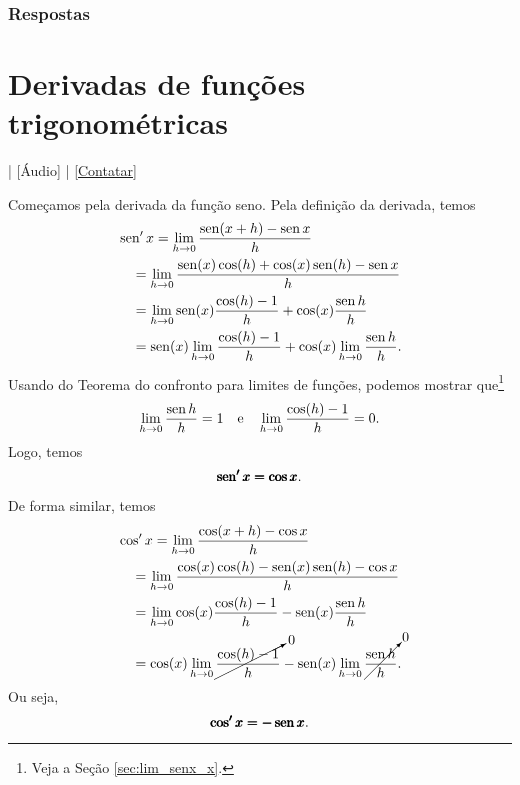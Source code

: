 \ifisbook
\subsubsection{Respostas}
\shipoutAnswer
\fi


\section{Derivadas de funções trigonométricas}\label{cap_deriv_sec_trigo}

\begin{flushright}
  [Vídeo] | [Áudio] | \href{https://phkonzen.github.io/notas/contato.html}{[Contatar]}
\end{flushright}

Começamos pela derivada da função seno. Pela definição da derivada, temos
\begin{align}
  & \operatorname{sen}' x = \lim_{h\to 0} \frac{\operatorname{sen}(x+h) - \operatorname{sen} x}{h} \\
  & \text{}\quad = \lim_{h\to 0} \frac{\operatorname{sen}(x)\cos(h)+\cos(x)\operatorname{sen}(h) - \operatorname{sen} x}{h} \\
  & \text{}\quad = \lim_{h\to 0} \operatorname{sen}(x)\frac{\cos(h) - 1}{h} + \cos(x)\frac{\operatorname{sen} h}{h}\\
  & \text{}\quad = \operatorname{sen}(x) \lim_{h\to 0} \frac{\cos(h)-1}{h} + \cos(x)\lim_{h\to 0} \frac{\operatorname{sen} h}{h}.
\end{align}
Usando do Teorema do confronto para limites de funções, podemos mostrar que\footnote{Veja a Seção \ref{sec:lim_senx_x}.}
\begin{equation}
  \lim_{h\to 0} \frac{\operatorname{sen} h}{h} = 1\quad\text{e}\quad\lim_{h\to 0} \frac{\cos(h) - 1}{h} = 0.
\end{equation}
Logo, temos
\begin{equation}
  \pmb{\operatorname{sen}' x = \cos x}.
\end{equation}

De forma similar, temos
\begin{align}
  & \cos' x = \lim_{h\to 0} \frac{\cos(x+h) - \cos x}{h} \\
  & \text{}\quad = \lim_{h\to 0} \frac{\cos(x)\cos(h)-\operatorname{sen}(x)\operatorname{sen}(h) - \cos x}{h} \\
  & \text{}\quad = \lim_{h\to 0} \cos(x)\frac{\cos(h) - 1}{h} - \operatorname{sen}(x)\frac{\operatorname{sen} h}{h}\\
  & \text{}\quad = \cos(x) \lim_{h\to 0} \cancelto{0}{\frac{\cos(h)-1}{h}} - \operatorname{sen}(x)\lim_{h\to 0} \cancelto{0}{\frac{\operatorname{sen} h}{h}}.
\end{align}
Ou seja,
\begin{equation}
  \pmb{\cos' x = -\operatorname{sen} x}.
\end{equation}

